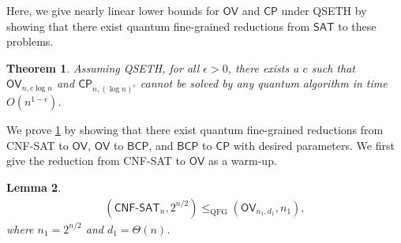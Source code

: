 \documentclass[10pt,a4paper]{article}
\newtheorem{theorem}{Theorem}
\newtheorem{lemma}[theorem]{Lemma}
\newcommand{\QFG}{\mathrm{QFG}}
\newcommand{\CP}{\ensuremath{\mathsf{CP}}}
\newcommand{\OV}{\ensuremath{\mathsf{OV}}}
\newcommand{\BCP}{\ensuremath{\mathsf{BCP}}}
\begin{document}
Here, we give nearly linear lower bounds for $\OV$ and $\CP$ under QSETH by showing that there exist quantum fine-grained reductions from $\textsf{SAT}$ to these problems. 

\begin{theorem}\label{thm:qseth}
Assuming QSETH, for all $\epsilon>0$, there exists a $c$ such that $\OV_{n,c\log n}$ and $\CP_{n,(\log n)^c}$ cannot be solved by any quantum algorithm in time $O(n^{1-\epsilon})$.
\end{theorem}


We prove \cref{thm:qseth} by showing that there exist quantum fine-grained reductions from \textsf{CNF-SAT} to $\OV$, $\OV$ to $\BCP$, and $\BCP$ to $\CP$ with desired parameters.  We first give the reduction from \textsf{CNF-SAT} to $\OV$ as a warm-up. 

\begin{lemma}\label{lem:sat_q_ov}
\begin{align}
    (\mathsf{CNF\text{-}SAT}_{n},2^{n/2})\leq_{\QFG} (\OV_{n_1,d_1},n_1),
\end{align}
where $n_1=2^{n/2}$ and $d_1=\Theta(n)$.
\end{lemma}
\end{document}
